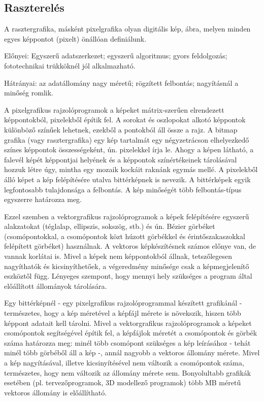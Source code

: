 \documentclass[12pt]{article}
\theoremstyle{plain}
\begin{document}
\subsection{Raszterelés}

A rasztergrafika, másként pixelgrafika olyan digitális kép, ábra, melyen minden egyes képpontot (pixelt) önállóan definiálunk. 

Előnyei: Egyszerű adatszerkezet; egyszerű algoritmus; gyors feldolgozás; fototechnikai trükköknél jól alkalmazható.

Hátrányai: az adatállomány nagy méretű; rögzített felbontás; nagyításnál a minőség romlik.

A pixelgrafikus rajzolóprogramok a képeket mátrix-szerűen elrendezett képpontokból, pixelekből építik fel. A sorokat és oszlopokat alkotó képpontok különböző színűek lehetnek, ezekből a pontokból áll össze a rajz. A bitmap grafika (vagy rasztergrafika) egy kép tartalmát egy négyzetrácson elhelyezkedő színes képpontok összességeként, ún. pixelekkel írja le. Ahogy a képen látható, a falevél képét képpontjai helyének és a képpontok színértékeinek tárolásával hozzuk létre úgy, mintha egy mozaik kockáit raknánk egymás mellé. A pixelekből álló képet a kép felépítésére utalva bittérképnek is nevezik. A bittérképek egyik legfontosabb tulajdonsága a felbontás. A kép minőségét több felbontás-típus egyszerre határozza meg.

Ezzel szemben a vektorgrafikus rajzolóprogramok a képek felépítésére egyszerű alakzatokat (téglalap, ellipszis, sokszög, stb.) és ún. Bézier görbéket (csomópontokkal, a csomópontok közt húzott görbékkel és érintőszakaszokkal felépített görbéket) használnak. A vektoros képkészítésnek számos előnye van, de vannak korlátai is. Mivel a képek nem képpontokból állnak, tetszőlegesen nagyíthatók és kicsinyíthetőek, a végeredmény minősége csak a képmegjelenítő eszköztől függ. Lényeges szempont, hogy mennyi hely szükséges a program által előállított állományok tárolására.

Egy bittérképnél - egy pixelgrafikus rajzolóprogrammal készített grafikánál - természetes, hogy a kép méretével a képfájl mérete is növekszik, hiszen több képpont adatait kell tárolni. Mivel a vektorgrafikus rajzolóprogramok a képeket csomópontok segítségével építik fel, a képfájlok méretét a csomópontok és görbék száma határozza meg: minél több csomópont szükséges a kép leírásához - tehát minél több görbéből áll a kép -, annál nagyobb a vektoros állomány mérete. Mivel a kép nagyításával, illetve kicsinyítésével nem változik a csomópontok száma, természetes, hogy nem változik az állomány mérete sem. Bonyolultabb grafikák esetében (pl. tervezőprogramok, 3D modellező programok) több MB méretű vektoros állomány is előállítható.
\end{document}

